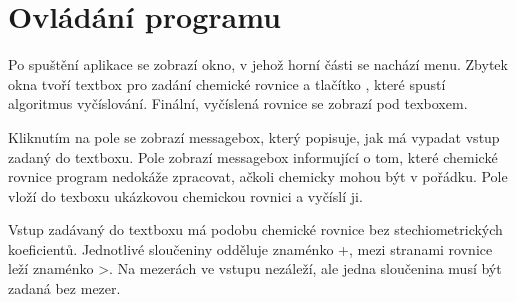 \documentclass[12pt,a4paper]{report}
\begin{document}
\chapter{Ovládání programu}
Po spuštění aplikace se zobrazí okno, v jehož horní části se nachází menu. Zbytek okna tvoří textbox pro zadání chemické rovnice a tlačítko , které spustí algoritmus vyčíslování. Finální, vyčíslená rovnice se zobrazí pod texboxem.

Kliknutím na pole  se zobrazí messagebox, který popisuje, jak má vypadat vstup zadaný do textboxu. Pole  zobrazí messagebox informující o tom, které chemické rovnice program nedokáže zpracovat, ačkoli chemicky mohou být v pořádku. Pole  vloží do texboxu ukázkovou chemickou rovnici a vyčíslí ji.

Vstup zadávaný do textboxu má podobu chemické rovnice bez stechiometrických koeficientů. Jednotlivé sloučeniny odděluje znaménko +, mezi stranami rovnice leží znaménko >. Na mezerách ve vstupu nezáleží, ale jedna sloučenina musí být zadaná bez mezer.
\end{document}
